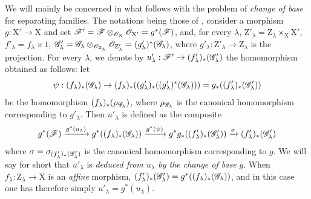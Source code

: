 \begin{env}[11.9.5]
\label{IV.11.9.5}
We will mainly be concerned in what follows with the problem of \emph{change of base} for separating families.
The notations being those of , consider a morphism $g:\mathrm{X}'\to\mathrm{X}$ and set $\mathscr{F}'=\mathscr{F}\otimes_{\mathscr{O}_\mathrm{X}}\mathscr{O}_{\mathrm{X}'}=g^*(\mathscr{F})$, and, for every $\lambda$, $\mathrm{Z}'_\lambda=\mathrm{Z}_\lambda\times_\mathrm{X}\mathrm{X}'$, $f'_\lambda=f_\lambda\times 1$, $\mathscr{G}'_\lambda=\mathscr{G}_\lambda\otimes_{\mathscr{O}_{\mathrm{Z}_\lambda}}\mathscr{O}_{\mathrm{Z}'_\lambda}=(g'_\lambda)^*(\mathscr{G}_\lambda)$, where $g'_\lambda:\mathrm{Z}'_\lambda\to\mathrm{Z}_\lambda$ is the projection.
For every $\lambda$, we denote by $u'_\lambda:\mathscr{F}'\to(f'_\lambda)_*(\mathscr{G}'_\lambda)$ the homomorphism obtained as follows: let
\[
  \psi:(f_\lambda)_*(\mathscr{G}_\lambda)\to(f_\lambda)_*((g'_\lambda)_*((g'_\lambda)^*(\mathscr{G}_\lambda)))=g_*((f'_\lambda)_*(\mathscr{G}'_\lambda))
\]
be the homomorphism $(f_\lambda)_*(\rho_{\mathscr{G}_\lambda})$, where $\rho_{\mathscr{G}_\lambda}$ is the canonical homomorphism  corresponding to $g'_\lambda$.
Then $u'_\lambda$ is defined as the composite
\[
  g^*(\mathscr{F})\xrightarrow{g^*(u_\lambda)}g^*((f_\lambda)_*(\mathscr{G}_\lambda))\xrightarrow{g^*(\psi)}g^*g_*((f'_\lambda)_*(\mathscr{G}'_\lambda))\xrightarrow{\sigma}(f'_\lambda)_*(\mathscr{G}'_\lambda)
\]
where $\sigma=\sigma_{(f'_\lambda)_*(\mathscr{G}'_\lambda)}$ is the canonical homomorphism  corresponding to $g$.
We will say for short that $u'_\lambda$ is \emph{deduced from $u_\lambda$ by the change of base} $g$.
When $f_\lambda:\mathrm{Z}_\lambda\to\mathrm{X}$ is an \emph{affine} morphism, $(f'_\lambda)_*(\mathscr{G}'_\lambda)=g^*((f_\lambda)_*(\mathscr{G}_\lambda))$, and in this case one has therefore simply $u'_\lambda=g^*(u_\lambda)$.


\end{env}
